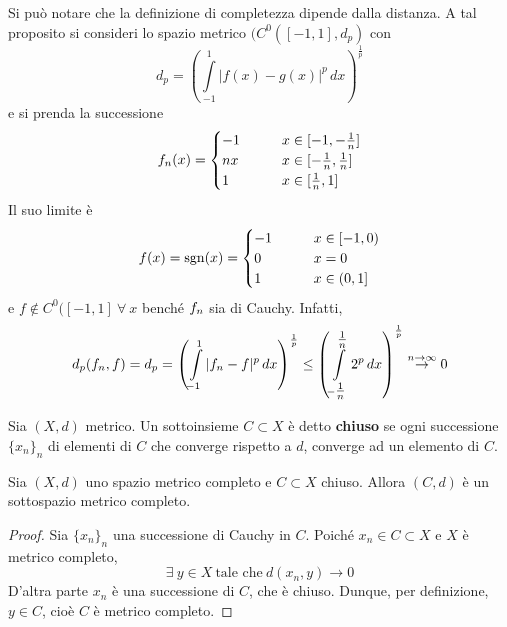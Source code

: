 \begin{oss}
    Si può notare che la definizione di completezza dipende dalla distanza. A tal proposito si consideri lo spazio metrico $(C^0([-1,1], d_p)$ con 
    \begin{equation*}
        d_p=\left(\int\limits_{-1}^{1}{|f(x)-g(x)|^p\, dx}\right)^\frac{1}{p}
    \end{equation*}
    e si prenda la successione
    \begin{equation*}
        f_n(x) = \begin{cases}
            -1 &\qquad x \in [-1, -\frac{1}{n}]\\
            nx &\qquad x \in [-\frac{1}{n}, \frac{1}{n}]\\
            1 &\qquad x \in [\frac{1}{n}, 1]
        \end{cases}
    \end{equation*}
    Il suo limite è
    \begin{equation*}
        f(x)= \operatorname{sgn}(x)=\begin{cases}
            -1 &\qquad x \in [-1,0)\\
            0 &\qquad x =0\\
            1 &\qquad x \in (0, 1]
        \end{cases}
    \end{equation*}
    e $f\notin C^0([-1, 1]\ \forall\ x$
    benché $f_n$ sia di Cauchy. Infatti, 
    \begin{equation*}
        d_p(f_n, f)=  d_p=\left(\int\limits_{-1}^{1}{|f_n-f|^p\, dx}\right)^\frac{1}{p} \leq \left(\int\limits_{-\tfrac{1}{n}}^{\tfrac{1}{n}}{2^p\, dx}\right)^\frac{1}{p} \overset{n \to \infty}{\to }0
    \end{equation*}
\end{oss}
\begin{definition} \label{Def: Spazio chiuso}
    Sia $(X, d)$ metrico. Un sottoinsieme $C \subset X$ è detto \textbf{chiuso} se ogni successione $\{x_n\}_n$ di elementi di $C$ che converge rispetto a $d$, converge ad un elemento di $C$.
\end{definition}
\begin{theorem} \label{Teo: Sottospazio chiuso di un completo è completo}
    Sia $(X,d)$ uno spazio metrico completo e $C \subset X$ chiuso. Allora $(C, d)$ è un sottospazio metrico completo.
\end{theorem}
\begin{proof}
    Sia $\{x_n\}_n$ una successione di Cauchy in $C$. Poiché $x_n \in C \subset X$ e $X$ è metrico completo, 
    \begin{equation}
        \exists\ y \in X\ \text{tale che}\ d(x_n, y)\to 0
    \end{equation}
    D'altra parte $x_n$ è una successione di $C$, che è chiuso. Dunque, per definizione, $y \in C$, cioè $C$ è metrico completo.
\end{proof}
